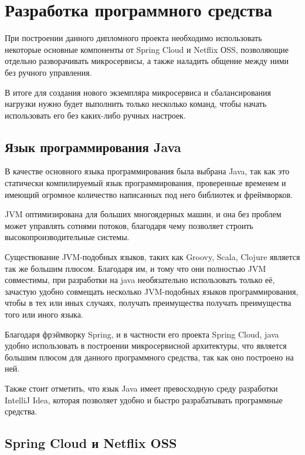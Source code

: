 \section{Разработка программного средства}
\label{sec:development:intro}

При построении данного дипломного проекта необходимо использовать некоторые основные компоненты от Spring Cloud и Netflix ОSS, позволяющие отдельно разворачивать микросервисы, а также наладить общение между ними без ручного управления. 

В итоге для создания нового экземпляра микросервиса и сбалансирования нагрузки нужно будет выполнить только несколько команд, чтобы начать использовать его без каких-либо ручных настроек.


\subsection{Язык программирования Java}
\label{sub:development:java}
В качестве основного языка программирования была выбрана Java, так как это статически компилируемый язык программирования, проверенные временем и имеющий огромное количество написанных под него библиотек и фреймворков. 

JVM оптимизирована для больших многоядерных машин, и она без проблем может управлять сотнями потоков, благодаря чему позволяет строить высокопроизводительные системы.

Существование JVM-подобных языков, таких как Groovy, Scala, Clojure является так же большим плюсом. Благодаря им, и тому что они полностью JVM совместимы, при разработки на java необязательно использовать только её, зачастую удобно совмещать несколько JVM-подобных языков программирования, чтобы в тех или иных случаях, получать преимущества получать преимущества того или иного языка.   

Благодаря фрэймворку Spring, и в частности его проекта Spring Cloud, java удобно использовать в построении микросервисной архитектуры, что является большим плюсом для данного программного средства, так как оно построено на ней. 

Также стоит отметить, что язык Java имеет превосходную среду разработки IntelliJ Idea, которая позволяет удобно и быстро разрабатывать программные средства.


\subsection{Spring Cloud и Netflix OSS}
\label{sub:development:netflix}

